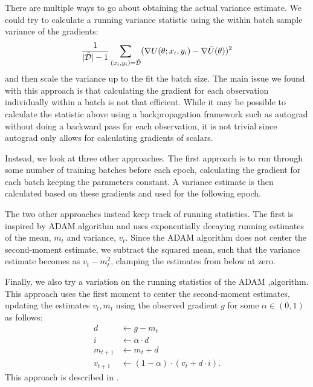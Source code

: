 There are multiple ways to go about obtaining the actual variance estimate.
We could try to calculate a running variance statistic using the within batch sample variance of the gradients:
\begin{equation}
    \frac{1}{|\tilde{\mathcal{D}}|-1}\sum_{(x_i,y_i)=\tilde{\mathcal{D}}} (\nabla U(\theta; x_i, y_i) - \nabla \bar{U}(\theta))^2
\end{equation}
and then scale the variance up to the fit the batch size. 
The main issue we found with this approach is that calculating the gradient for each observation individually within a batch is not that efficient.
While it may be possible to calculate the statistic above using a backpropagation framework such as autograd without doing a backward pass for each observation, it is not trivial since autograd only allows for calculating gradients of scalars. 

Instead, we look at three other approaches. 
The first approach is to run through some number of training batches before each epoch, calculating the gradient for each batch keeping the parameters constant. 
A variance estimate is then calculated based on these gradients and used for the following epoch.

The two other approaches instead keep track of running statistics. 
The first is inspired by  ADAM algorithm \cite{kingma_adam_2017} and uses exponentially decaying running estimates of the mean, $m_t$ and variance, $v_t$.  
Since the ADAM algorithm does not center the second-moment estimate, we subtract the squared mean, such that the variance estimate becomes as $v_t - m_t^2$, clamping the estimates from below at zero.

Finally, we also try a variation on the running statistics of the ADAM ,algorithm.
This approach uses the first moment to center the second-moment estimates, updating the estimates $v_t,m_t$ using the observed gradient $g$  for some $\alpha\in(0,1)$ as follows:
\begin{align}
    d &\gets g - m_t \\
    i &\gets \alpha \cdot d \\
    m_{t+1} &\gets m_t + d \\
    v_{t+1} &\gets (1 - \alpha)\cdot  (v_t +  d\cdot i).
\end{align}
This approach is described in \cite{finch_incremental_nodate}.

